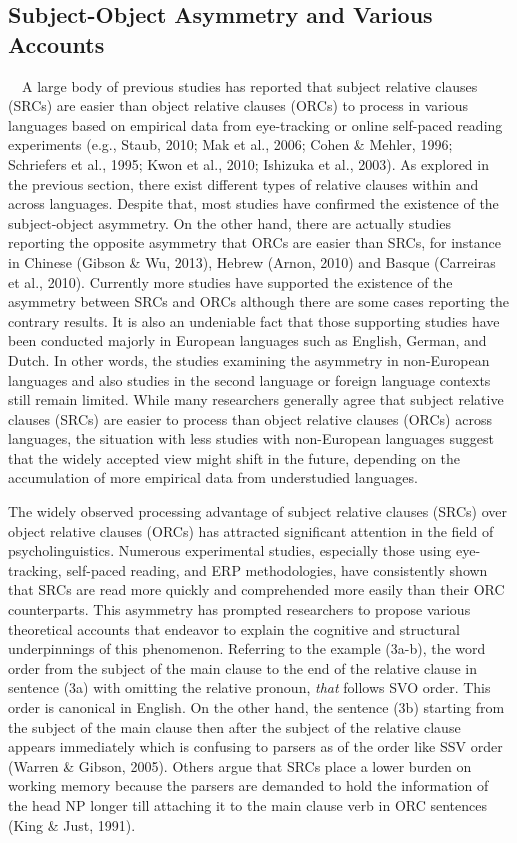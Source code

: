\documentclass[
]{article}
\begin{document}
\subsection{Subject-Object Asymmetry and Various
Accounts}\label{subject-object-asymmetry-and-various-accounts}

\indent　A large body of previous studies has reported that subject
relative clauses (SRCs) are easier than object relative clauses (ORCs)
to process in various languages based on empirical data from
eye-tracking or online self-paced reading experiments (e.g., Staub,
2010; Mak et al., 2006; Cohen \& Mehler, 1996; Schriefers et al., 1995;
Kwon et al., 2010; Ishizuka et al., 2003). As explored in the previous
section, there exist different types of relative clauses within and
across languages. Despite that, most studies have confirmed the
existence of the subject-object asymmetry. On the other hand, there are
actually studies reporting the opposite asymmetry that ORCs are easier
than SRCs, for instance in Chinese (Gibson \& Wu, 2013), Hebrew (Arnon,
2010) and Basque (Carreiras et al., 2010). Currently more studies have
supported the existence of the asymmetry between SRCs and ORCs although
there are some cases reporting the contrary results. It is also an
undeniable fact that those supporting studies have been conducted
majorly in European languages such as English, German, and Dutch. In
other words, the studies examining the asymmetry in non-European
languages and also studies in the second language or foreign language
contexts still remain limited. While many researchers generally agree
that subject relative clauses (SRCs) are easier to process than object
relative clauses (ORCs) across languages, the situation with less
studies with non-European languages suggest that the widely accepted
view might shift in the future, depending on the accumulation of more
empirical data from understudied languages.

The widely observed processing advantage of subject relative clauses
(SRCs) over object relative clauses (ORCs) has attracted significant
attention in the field of psycholinguistics. Numerous experimental
studies, especially those using eye-tracking, self-paced reading, and
ERP methodologies, have consistently shown that SRCs are read more
quickly and comprehended more easily than their ORC counterparts. This
asymmetry has prompted researchers to propose various theoretical
accounts that endeavor to explain the cognitive and structural
underpinnings of this phenomenon. Referring to the example (3a-b), the
word order from the subject of the main clause to the end of the
relative clause in sentence (3a) with omitting the relative pronoun,
\emph{that} follows SVO order. This order is canonical in English. On
the other hand, the sentence (3b) starting from the subject of the main
clause then after the subject of the relative clause appears immediately
which is confusing to parsers as of the order like SSV order (Warren \&
Gibson, 2005). Others argue that SRCs place a lower burden on working
memory because the parsers are demanded to hold the information of the
head NP longer till attaching it to the main clause verb in ORC
sentences (King \& Just, 1991).
\end{document}
